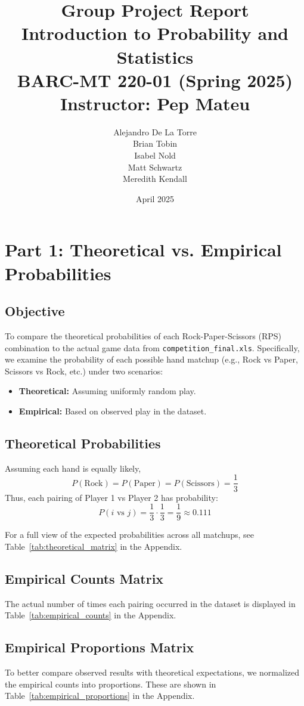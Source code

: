 \documentclass[12pt]{article}
\title{\textbf{Group Project Report}\\
\large Introduction to Probability and Statistics\\
BARC-MT 220-01 (Spring 2025)\\
Instructor: Pep Mateu}
\author{
    Alejandro De La Torre \\
    Brian Tobin \\
    Isabel Nold \\
    Matt Schwartz \\
    Meredith Kendall
}
\date{April 2025}
\begin{document}
\maketitle
\tableofcontents
\newpage

\section*{Part 1: Theoretical vs. Empirical Probabilities}

\subsection*{Objective}
To compare the theoretical probabilities of each Rock-Paper-Scissors (RPS) combination to the actual game data from \texttt{competition\_final.xls}. Specifically, we examine the probability of each possible hand matchup (e.g., Rock vs Paper, Scissors vs Rock, etc.) under two scenarios:
\begin{itemize}
    \item \textbf{Theoretical:} Assuming uniformly random play.
    \item \textbf{Empirical:} Based on observed play in the dataset.
\end{itemize}

\subsection*{Theoretical Probabilities}
Assuming each hand is equally likely,
\[
P(\text{Rock}) = P(\text{Paper}) = P(\text{Scissors}) = \frac{1}{3}
\]
Thus, each pairing of Player 1 vs Player 2 has probability:
\[
P(i \text{ vs } j) = \frac{1}{3} \cdot \frac{1}{3} = \frac{1}{9} \approx 0.111
\]

For a full view of the expected probabilities across all matchups, see Table~\ref{tab:theoretical_matrix} in the Appendix.

\subsection*{Empirical Counts Matrix}
The actual number of times each pairing occurred in the dataset is displayed in Table~\ref{tab:empirical_counts} in the Appendix.

\subsection*{Empirical Proportions Matrix}
To better compare observed results with theoretical expectations, we normalized the empirical counts into proportions. These are shown in Table~\ref{tab:empirical_proportions} in the Appendix.
\end{document}
